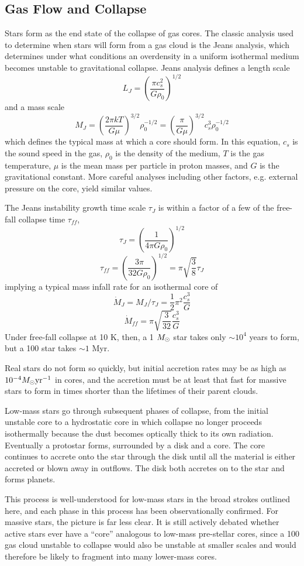 \subsection{Gas Flow and Collapse}
Stars form as the end state of the collapse of gas cores.  The classic analysis
used to determine when stars will form from a gas cloud is the Jeans analysis, which
determines under what conditions an overdensity in a uniform isothermal medium
becomes unstable to gravitational collapse.  Jeans analysis defines a length scale
$$L_J = \left( \frac{\pi c_s^2}{G \rho_0} \right)^{1/2}$$
and a mass scale
$$M_J = \left(\frac{2 \pi k T}{G \mu}\right)^{3/2} \rho_0^{-1/2} = \left(\frac{\pi}{G \mu}\right)^{3/2} c_s^3 \rho_0^{-1/2}$$
which defines the typical mass at which a core should form.  In this equation,
$c_s$ is the sound speed in the gas, $\rho_0$ is the density of the medium, $T$
is the gas temperature, $\mu$ is the mean mass per particle in proton masses, and $G$ is
the gravitational constant.  More careful analyses including other factors,
e.g. external pressure on the core, yield similar values.

The Jeans instability growth time scale $\tau_{J}$ is within a factor of a few
of the free-fall collapse time $\tau_{ff}$,
$$\tau_J = \left(\frac{1}{4 \pi G \rho_0}\right)^{1/2}$$
$$\tau_{ff} = \left(\frac{3\pi}{32 G \rho_0}\right)^{1/2} =  \pi\sqrt{\frac{3}{8}} \tau_J$$
implying a typical mass infall rate for an isothermal core of
$$\dot{M}_J = M_J/\tau_J =  \frac{1}{2} \pi^2 \frac{c_s^3}{G}$$
$$\dot{M}_{ff} = \pi \sqrt{\frac{3}{32}} \frac{c_s^3}{G}$$
Under free-fall collapse at 10 K, then, a 1 $M_{\odot}$ star takes only $\sim10^4$
years to form, but a 100 \msun star takes $\sim1$ Myr.

Real stars do not form so quickly, but initial accretion rates may be as high
as $10^{-4} M_{\odot} \textrm{yr}^{-1}$ in cores, and the accretion must be at least that
fast for massive stars to form in times shorter than the lifetimes of their
parent clouds.  

Low-mass stars go through subsequent phases of collapse, from the initial
unstable core to a hydrostatic core in which collapse no longer proceeds
isothermally because the dust becomes optically thick to its own radiation.
Eventually a protostar forms, surrounded by a disk and a core.  The core
continues to accrete onto the star through the disk until all the material is
either accreted or blown away in outflows.  The disk both accretes on to the
star and forms planets.

This process is well-understood for low-mass stars in the broad strokes
outlined here, and each phase in this process has been observationally
confirmed.  For massive stars, the picture is far less clear.  It is still
actively debated whether active stars ever have a ``core'' analogous to 
low-mass pre-stellar cores, since a 100 \msun gas cloud unstable to collapse
would also be unstable at smaller scales and would therefore be likely to fragment
into many lower-mass cores.

